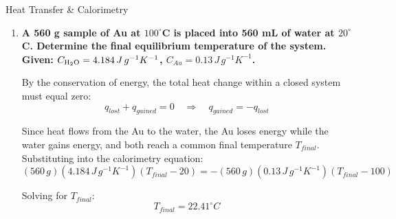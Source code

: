 \documentclass[10pt]{article}
\begin{document}
\begin{core}{Heat Transfer \& Calorimetry}
\begin{enumerate}
        \item \textbf{A 560 g sample of Au at $100^{\circ}$C is placed into 560 mL of water at $20^{\circ}$C. Determine the final equilibrium temperature of the system. Given: $C_{\ce{H2O}} = 4.184\, J\, g^{-1} K^{-1}$, $C_{Au} = 0.13\, J\, g^{-1} K^{-1}$.}

        By the conservation of energy, the total heat change within a closed system must equal zero:
        \[
          q_{lost} + q_{gained} = 0 \quad \Longrightarrow \quad q_{gained} = -q_{lost}
        \]

        Since heat flows from the Au to the water, the Au loses energy while the water gains energy, and both reach a common final temperature $T_{final}$. Substituting into the calorimetry equation:
        \[
          (560\, g)(4.184\, J\, g^{-1} K^{-1})(T_{final} - 20) = -(560\, g)(0.13\, J\, g^{-1} K^{-1})(T_{final} - 100)
        \]

        Solving for $T_{final}$:
        \[
          T_{final} = 22.41^{\circ}C
        \]

      \end{enumerate}

    \end{core}   
\end{document}
